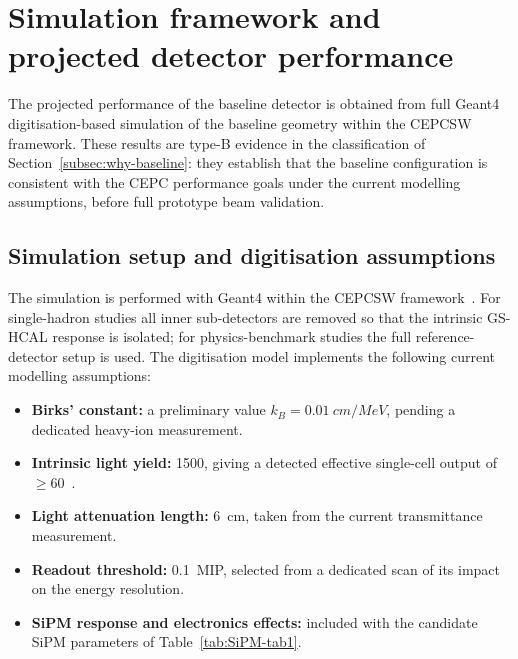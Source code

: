 \section{Simulation framework and projected detector performance}
\label{sec:simperf}

The projected performance of the baseline detector is obtained from
full Geant4 digitisation-based simulation of the baseline geometry
within the CEPCSW framework.
These results are type-B evidence in the classification of
Section~\ref{subsec:why-baseline}: they establish that the baseline
configuration is consistent with the CEPC performance goals under the
current modelling assumptions, before full prototype beam validation.

\subsection{Simulation setup and digitisation assumptions}
\label{subsec:simsetup}

The simulation is performed with Geant4 within the CEPCSW
framework~\cite{CEPCStudyGroup:2018ghi}.
For single-hadron studies all inner sub-detectors are removed so that
the intrinsic GS-HCAL response is isolated; for physics-benchmark
studies the full reference-detector setup is used.
The digitisation model implements the following current modelling
assumptions:

\begin{itemize}
\item \textbf{Birks' constant:} a preliminary value
  $k_{B}=\SI{0.01}{cm/MeV}$, pending a dedicated heavy-ion
  measurement.
\item \textbf{Intrinsic light yield:} \SI{1500}{\phMeV}, giving a
  detected effective single-cell output of $\geq60$~\peMIP.
\item \textbf{Light attenuation length:} \SI{6}{cm}, taken from the
  current transmittance measurement.
\item \textbf{Readout threshold:} \SI{0.1}{MIP}, selected from a
  dedicated scan of its impact on the energy resolution.
\item \textbf{SiPM response and electronics effects:} included with
  the candidate SiPM parameters of Table~\ref{tab:SiPM-tab1}.
\end{itemize}

